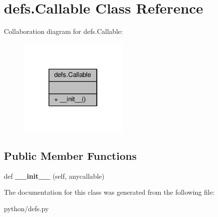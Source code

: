 \hypertarget{classdefs_1_1Callable}{}\section{defs.\+Callable Class Reference}
\label{classdefs_1_1Callable}


Collaboration diagram for defs.\+Callable\+:
\nopagebreak
\begin{figure}[H]
\begin{center}
\leavevmode
\includegraphics[width=154pt]{d5/d35/classdefs_1_1Callable__coll__graph}
\end{center}
\end{figure}
\subsection*{Public Member Functions}
\begin{DoxyCompactItemize}
\item 
def {\bfseries \+\_\+\+\_\+init\+\_\+\+\_\+} (self, anycallable)\hypertarget{classdefs_1_1Callable_af3048d3b470b73607602b3e5f9f9b6c8}{}\label{classdefs_1_1Callable_af3048d3b470b73607602b3e5f9f9b6c8}

\end{DoxyCompactItemize}


The documentation for this class was generated from the following file\+:\begin{DoxyCompactItemize}
\item 
python/defs.\+py\end{DoxyCompactItemize}
